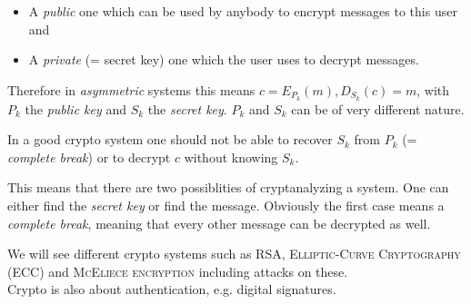\begin{itemize}
\item A \emph{public} one which can be used by anybody to encrypt messages to this user and
\item A \emph{private} (= secret key) one which the user uses to decrypt messages.
\end{itemize}

Therefore in \emph{asymmetric} systems this means $c= E_{P_k} (m), D_{S_k}(c) = m$, with $P_k$ the \emph{public key} and $S_k$ the \emph{secret key}. $P_k$ and $S_k$ can be of very different nature.

In a good crypto system one should not be able to recover $S_k$ from $P_k$ (= \emph{complete break}) or to decrypt $c$ without knowing $S_k$.

\begin{remark}
This means that there are two possiblities of cryptanalyzing a system. One can either find the \emph{secret key} or find the message. Obviously the first case means a \emph{complete break}, meaning that every other message can be decrypted as well.
\end{remark}

We will see different crypto systems such as \textsc{RSA}, \textsc{Elliptic-Curve Cryptography (ECC)} and \textsc{McEliece encryption} including attacks on these. \\

\noindent Crypto is also about authentication, e.g. digital signatures.


